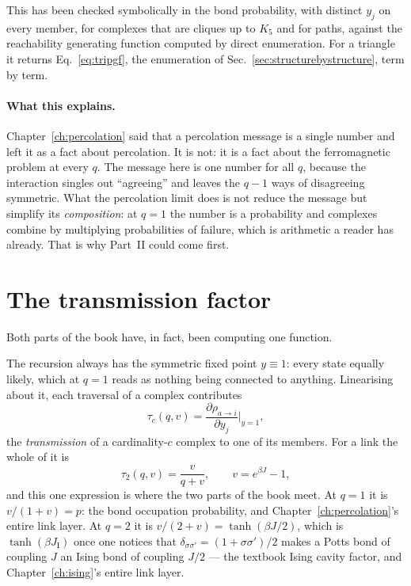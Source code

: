 This has been checked symbolically in the bond probability, with distinct
$y_{j}$ on every member, for complexes that are cliques up to $K_{5}$ and for
paths, against the reachability generating function computed by direct
enumeration. For a triangle it returns Eq.~\eqref{eq:tripgf}, the enumeration
of Sec.~\ref{sec:structurebystructure}, term by term.

\paragraph{What this explains.} Chapter~\ref{ch:percolation} said that a
percolation message is a single number and left it as a fact about percolation.
It is not: it is a fact about the ferromagnetic problem at every $q$. The
message here is one number for all $q$, because the interaction singles out
``agreeing'' and leaves the $q-1$ ways of disagreeing symmetric. What the
percolation limit does is not reduce the message but simplify its
\emph{composition}: at $q=1$ the number is a probability and complexes combine
by multiplying probabilities of failure, which is arithmetic a reader has
already. That is why Part~II could come first.

\section{The transmission factor}
\label{sec:transmission}

Both parts of the book have, in fact, been computing one function.

The recursion always has the symmetric fixed point $y\equiv1$: every state
equally likely, which at $q=1$ reads as nothing being connected to anything.
Linearising about it, each traversal of a complex contributes
\begin{equation}
  \tau_{c}(q,v)=\frac{\partial\rho_{a\to i}}{\partial y_{j}}\bigg|_{y=1},
  \label{eq:taudef}
\end{equation}
the \emph{transmission} of a cardinality-$c$ complex to one of its members. For
a link the whole of it is
\begin{equation}
  \tau_{2}(q,v)=\frac{v}{q+v},
  \qquad v=e^{\beta J}-1,
  \label{eq:tau2}
\end{equation}
and this one expression is where the two parts of the book meet. At $q=1$ it is
$v/(1+v)=p$: the bond occupation probability, and
Chapter~\ref{ch:percolation}'s entire link layer. At $q=2$ it is
$v/(2+v)=\tanh(\beta J/2)$, which is $\tanh(\beta J_{\mathrm{I}})$ once one
notices that $\delta_{\sigma\sigma'}=(1+\sigma\sigma')/2$ makes a Potts bond of
coupling $J$ an Ising bond of coupling $J/2$ --- the textbook Ising cavity
factor, and Chapter~\ref{ch:ising}'s entire link layer.

